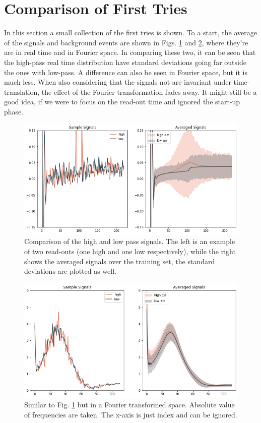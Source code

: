\newpage
\section*{Comparison of First Tries}
In this section a small collection of the first tries is shown. To a start, the average of the signals and background events are shown in Figs. \ref{fig:samples} and \ref{fig:samples_fft}, where they're are in real time and in Fourier space. In comparing these two, it can be seen that the high-pass real time distribution have standard deviations going far outside the ones with low-pass. A difference can also be seen in Fourier space, but it is much less. When also considering that the signals not are invariant under time-translation, the effect of the Fourier transformation fades away. It might still be a good idea, if we were to focus on the read-out time and ignored the start-up phase.

\begin{figure}[H]
    \centering
    \includegraphics[width = \textwidth]{Figures/johann_first/sample.png}
    \caption{Comparison of the high and low pass signals. The left is an example of two read-outs (one high and one low respectively), while the right shows the averaged signals over the training set, the standard deviations are plotted as well.}
    \label{fig:samples}
\end{figure}



\begin{figure}[H]
    \centering
    \includegraphics[width = 0.6 \textwidth]{Figures/johann_first/FFT_sample.png}
    \caption{Similar to Fig. \ref{fig:samples} but in a Fourier transformed space. Absolute value of frequencies are taken. The x-axis is just index and can be ignored. }
    \label{fig:samples_fft}
\end{figure}

